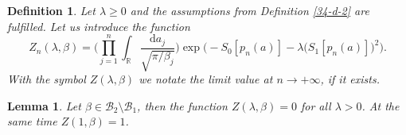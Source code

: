 \documentclass[a4paper]{article}
\newtheorem{lemma}{Lemma}
\newtheorem{deff}{Definition}
\begin{document}
\begin{deff}\label{34-d-8}
Let $\lambda\geqslant0$ and the assumptions from Definition \ref{34-d-2} are fulfilled. Let us introduce the function
\begin{equation}\label{34-17}
	Z_n(\lambda,\beta)=
	\Bigg(\prod_{j=1}^{n}\int_{\mathbb{R}}\frac{\mathrm{d}a_j}{\sqrt{\pi/\beta_j}}\Bigg)
	\exp\bigg(-S_0[p_n(a)]-\lambda\Big(S_1[p_n(a)]\Big)^2\bigg).
\end{equation}
With the symbol $Z(\lambda,\beta)$ we notate the limit value at $n\to+\infty$, if it exists.
\end{deff}
\begin{lemma}\label{34-l-4}
Let $\beta\in\mathcal{B}_2\setminus\mathcal{B}_1$, then the function $Z(\lambda,\beta)=0$ for all $\lambda>0$. At the same time $Z(1,\beta)=1$.
\end{lemma}
\end{document}

